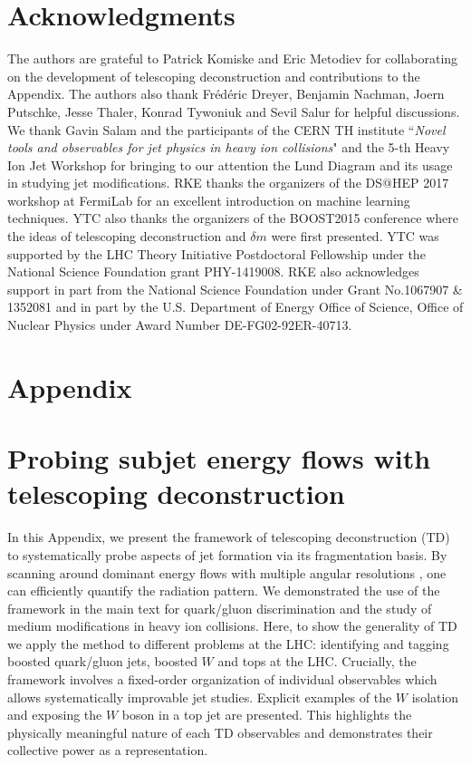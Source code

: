 \documentclass[notoc,preprintnumbers]{JHEP3}
\begin{document}
\section*{Acknowledgments}
The authors are grateful to Patrick Komiske and Eric Metodiev for collaborating on the development of telescoping deconstruction and contributions to the Appendix. The authors also thank Fr\'ed\'eric Dreyer, Benjamin Nachman, Joern Putschke, Jesse Thaler, Konrad Tywoniuk and Sevil Salur for helpful discussions. We thank Gavin Salam and the participants of the CERN TH institute ``{\sl Novel tools and observables for jet physics in heavy ion collisions}" and the 5-th Heavy Ion Jet Workshop for bringing to our attention the Lund Diagram and its usage in studying jet modifications. RKE thanks the organizers of the DS@HEP 2017 workshop at FermiLab for an excellent introduction on machine learning techniques. YTC also thanks the organizers of the BOOST2015 conference where the ideas of telescoping deconstruction and $\delta m$ were first presented. YTC was supported by the LHC Theory Initiative Postdoctoral Fellowship under the National Science Foundation grant PHY-1419008. RKE also acknowledges support in part from the National Science Foundation under Grant No.1067907 \& 1352081 and in part by the U.S. Department of Energy Office of Science, Office of Nuclear Physics under Award Number DE-FG02-92ER-40713.









\newpage
\appendix
\section*{Appendix}
\section{Probing subjet energy flows with telescoping deconstruction}

In this Appendix, we present the framework of telescoping deconstruction (TD) to systematically probe aspects of jet formation via its fragmentation basis. By scanning around dominant energy flows with multiple angular resolutions \cite{Chien:2013kca,Chien:2014hla}, one can efficiently quantify the radiation pattern. We demonstrated the use of the framework in the main text for quark/gluon discrimination and the study of medium modifications in heavy ion collisions. Here, to show the generality of TD we apply the method to different problems at the LHC: identifying and tagging boosted quark/gluon jets,  boosted $W$ and tops at the LHC. Crucially, the framework involves a fixed-order organization of individual observables which allows systematically improvable jet studies. Explicit examples of the $W$ isolation \cite{Chien:2017xrb} and exposing the $W$ boson in a top jet are presented. This highlights the physically meaningful nature of each TD observables and demonstrates their collective power as a representation.
\end{document}
